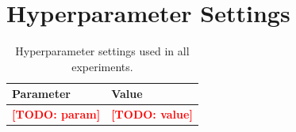 \documentclass[12pt, a4paper]{article}
\newcommand{\TODO}[1]{\textbf{\textcolor{red}{[TODO: #1]}}}
\begin{document}
\section{Hyperparameter Settings}
\label{app:hyperparams}

\begin{table}[H]
  \centering
  \caption{Hyperparameter settings used in all experiments.}
  \begin{tabular}{ll}
    \toprule
    Parameter & Value \\
    \midrule
    \TODO{param} & \TODO{value} \\
    \bottomrule
  \end{tabular}
\end{table}



\end{document}
